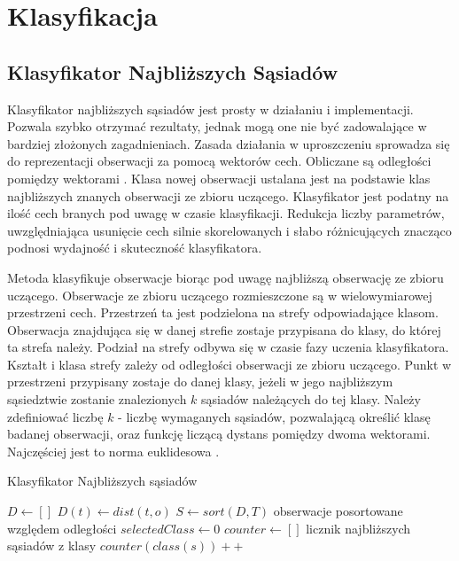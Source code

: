 \documentclass[a4paper,12pt,twoside,openany]{report}
\begin{document}
\section{Klasyfikacja}
\subsection{Klasyfikator Najbliższych Sąsiadów}
Klasyfikator najbliższych sąsiadów jest prosty w działaniu i implementacji.
Pozwala szybko otrzymać rezultaty, jednak mogą one nie być zadowalające w bardziej złożonych zagadnieniach.
Zasada działania w uproszczeniu sprowadza się do reprezentacji obserwacji za pomocą wektorów cech.
Obliczane są odległości pomiędzy wektorami \cite{Du2013}.
Klasa nowej obserwacji ustalana jest na podstawie klas najbliższych znanych obserwacji ze zbioru uczącego.
Klasyfikator jest podatny na ilość cech branych pod uwagę w czasie klasyfikacji.
Redukcja liczby parametrów, uwzględniająca usunięcie cech silnie skorelowanych i słabo różnicujących znacząco podnosi wydajność i skuteczność klasyfikatora.

Metoda klasyfikuje obserwacje biorąc pod uwagę najbliższą obserwację ze zbioru uczącego.
Obserwacje ze zbioru uczącego rozmieszczone są w wielowymiarowej przestrzeni cech.
Przestrzeń ta jest podzielona na strefy odpowiadające klasom.
Obserwacja znajdująca się w danej strefie zostaje przypisana do klasy, do której ta strefa należy.
Podział na strefy odbywa się w czasie fazy uczenia klasyfikatora.
Kształt i klasa strefy zależy od odległości obserwacji ze zbioru uczącego.
Punkt w przestrzeni przypisany zostaje do danej klasy, jeżeli w jego najbliższym sąsiedztwie zostanie znalezionych $k$ sąsiadów należących do tej klasy.
Należy zdefiniować liczbę $k$ - liczbę wymaganych sąsiadów, pozwalającą określić klasę badanej obserwacji, 
oraz funkcję liczącą dystans pomiędzy dwoma wektorami. Najczęściej jest to norma euklidesowa \cite{Martin2011}.

\begin{algorithm}
	\caption{Klasyfikator Najbliższych sąsiadów}
	\begin{algorithmic}[1]
		\State $D \leftarrow []$
		\State $D(t) \leftarrow dist(t, o)$
		\EndFor
		\State $S \leftarrow sort(D, T)$ \Comment obserwacje posortowane względem odległości
		\State $selectedClass \leftarrow 0$
		\State $counter \leftarrow []$ \Comment licznik najbliższych sąsiadów z klasy
		\Repeat
		\State $counter(class(s))++$
		\EndFor
		\EndProcedure
	\end{algorithmic}
	\label{alg:knn:alg}
\end{algorithm}
\end{document}
